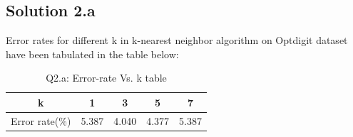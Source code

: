 \subsection*{Solution 2.a}
Error rates for different k in k-nearest neighbor algorithm on Optdigit dataset have been tabulated in the table below:
\begin{table}[h!]
	\begin{center}
		\begin{tabular}{||c | c | c | c | c ||} 
			\hline
			k & 1 & 3 & 5 & 7 \\ [0.5ex] 
			\hline\hline
			Error rate(\%) & 5.387 & 4.040 & 4.377 & 5.387 \\ [1ex]
			\hline
		\end{tabular}
	\end{center}
	\caption{Q2.a: Error-rate Vs. k table}
\end{table}
